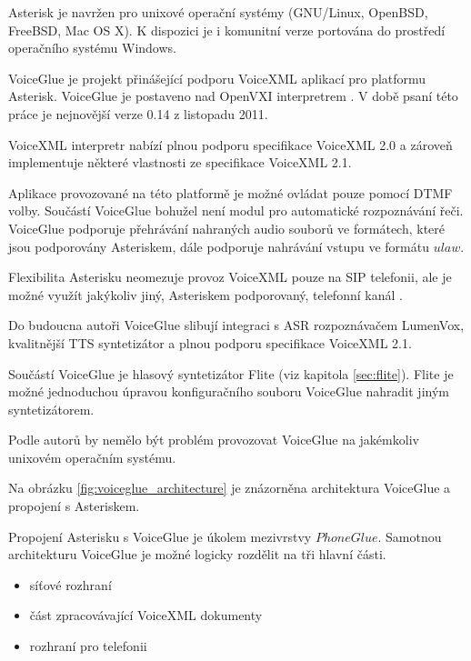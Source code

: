 \documentclass[ing,male,java,dept460]{diploma}						%
\begin{document}
Asterisk je navržen pro unixové operační systémy (GNU/Linux, OpenBSD, FreeBSD, Mac OS X). K dispozici je i komunitní verze portována do prostředí operačního systému Windows.

VoiceGlue je projekt přinášející podporu VoiceXML aplikací pro platformu Asterisk. VoiceGlue je postaveno nad OpenVXI interpretrem \cite{voiceglue_org}. V době psaní této práce je nejnovější verze 0.14 z listopadu 2011.

VoiceXML interpretr nabízí plnou podporu specifikace VoiceXML 2.0 a zároveň implementuje některé vlastnosti ze specifikace VoiceXML 2.1.

Aplikace provozované na této platformě je možné ovládat pouze pomocí DTMF volby. Součástí VoiceGlue bohužel není modul pro automatické rozpoznávání řeči. VoiceGlue podporuje přehrávání nahraných audio souborů ve formátech, které jsou podporovány Asteriskem, dále podporuje nahrávání vstupu ve formátu $ulaw$.

Flexibilita Asterisku neomezuje provoz VoiceXML pouze na SIP telefonii, ale je možné využít jakýkoliv jiný, Asteriskem podporovaný, telefonní kanál \cite{voiceglue_architecture}.

Do budoucna autoři VoiceGlue slibují integraci s ASR rozpoznávačem LumenVox, kvalitnější TTS syntetizátor a plnou podporu specifikace VoiceXML 2.1.

Součástí VoiceGlue je hlasový syntetizátor Flite (viz kapitola \ref{sec:flite}). Flite je možné jednoduchou úpravou konfiguračního souboru VoiceGlue nahradit jiným syntetizátorem.

Podle autorů by nemělo být problém provozovat VoiceGlue na jakémkoliv unixovém operačním systému.

Na obrázku \ref{fig:voiceglue_architecture} je znázorněna architektura VoiceGlue a propojení s Asteriskem.


Propojení Asterisku s VoiceGlue je úkolem mezivrstvy $PhoneGlue$. Samotnou architekturu VoiceGlue je možné logicky rozdělit na tři hlavní části.

\begin{itemize}
\item síťové rozhraní
\item část zpracovávající VoiceXML dokumenty
\item rozhraní pro telefonii
\end{itemize}
\end{document}
